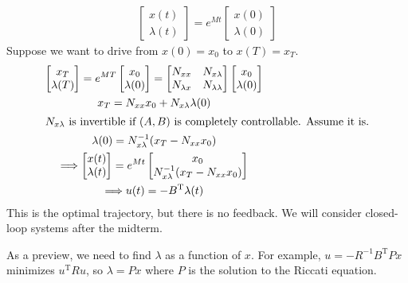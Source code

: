 \documentclass[letterpaper,12pt,titlepage]{report}
\newcommand{\trans}{^\text{T}}
\theoremstyle{plain}
\theoremstyle{definition}
\begin{document}
\begin{gather}
  \begin{bmatrix}
    x(t) \\ \lambda(t)
  \end{bmatrix} =
  e^{Mt}
  \begin{bmatrix}
    x(0) \\ \lambda(0)
  \end{bmatrix}
\end{gather}
Suppose we want to drive from $x(0)=x_0$ to $x(T)=x_T$.
\begin{gather}
  \begin{bmatrix}
    x_T \\ \lambda(T)
  \end{bmatrix} =
  e^{MT}
  \begin{bmatrix}
    x_0 \\ \lambda(0)
  \end{bmatrix} =
  \begin{bmatrix}
    N_{xx} & N_{x\lambda} \\
    N_{\lambda x} & N_{\lambda\lambda}
  \end{bmatrix}
  \begin{bmatrix}
    x_0 \\ \lambda(0)
  \end{bmatrix} \\
  x_T = N_{xx} x_0 + N_{x\lambda} \lambda(0) \\
  \intertext{$N_{x\lambda}$ is invertible if $(A,B)$ is completely controllable. Assume it is.}
  \lambda(0) = N_{x\lambda}^{-1} (x_T - N_{xx} x_0) \\
  \Longrightarrow
  \begin{bmatrix}
    x(t) \\ \lambda(t)
  \end{bmatrix} =
  e^{Mt}
  \begin{bmatrix}
    x_0 \\
    N_{x\lambda}^{-1} (x_T - N_{xx} x_0)
  \end{bmatrix} \\
  \Longrightarrow u(t) = -B\trans \lambda(t)
\end{gather}
This is the optimal trajectory, but there is no feedback. We will consider closed-loop systems after the midterm.

As a preview, we need to find $\lambda$ as a function of $x$. For example, $u=-R^{-1} B\trans Px$ minimizes $u\trans Ru$, so $\lambda=Px$ where $P$ is the solution to the Riccati equation.
\end{document}

